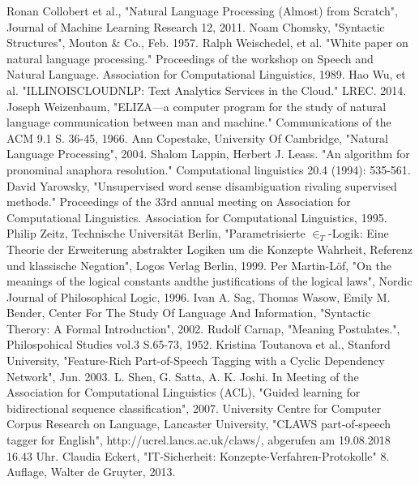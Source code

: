 \documentclass[12pt]{report}
\begin{document}
\newpage
\begin{thebibliography}{20}
Ronan Collobert et al., "Natural Language Processing (Almost) from Scratch", Journal of Machine Learning Research 12, 2011. 
 Noam Chomsky, "Syntactic Structures", Mouton \& Co., Feb. 1957.
Ralph Weischedel, et al. "White paper on natural language processing." Proceedings of the workshop on Speech and Natural Language. Association for Computational Linguistics, 1989.
Hao Wu, et al. "ILLINOISCLOUDNLP: Text Analytics Services in the Cloud." LREC. 2014.
Joseph Weizenbaum, "ELIZA—a computer program for the study of natural language communication between man and machine." Communications of the ACM 9.1 S. 36-45, 1966.
Ann Copestake, University Of Cambridge, "Natural Language Processing", 2004.
 Shalom Lappin, Herbert J. Leass. "An algorithm for pronominal anaphora resolution." Computational linguistics 20.4 (1994): 535-561.
David Yarowsky, "Unsupervised word sense disambiguation rivaling supervised methods." Proceedings of the 33rd annual meeting on Association for Computational Linguistics. Association for Computational Linguistics, 1995.
Philip Zeitz, Technische Universität Berlin, "Parametrisierte $\in_T$-Logik: Eine Theorie der Erweiterung abstrakter Logiken um die Konzepte Wahrheit, Referenz und klassische Negation", Logos Verlag Berlin, 1999.
Per Martin-Löf, "On the meanings of the logical constants andthe justifications of the logical laws", Nordic Journal of Philosophical Logic, 1996.
Ivan A. Sag, Thomas Wasow, Emily M. Bender, Center For The Study Of Language And Information, "Syntactic Therory: A Formal Introduction", 2002.
Rudolf Carnap, "Meaning Postulates.", Philospohical Studies vol.3 S.65-73, 1952.
Kristina Toutanova et al., Stanford University, "Feature-Rich Part-of-Speech Tagging with a Cyclic Dependency Network", Jun. 2003.
 L. Shen, G. Satta, A. K. Joshi. In Meeting of the Association for Computational Linguistics (ACL), "Guided learning for bidirectional sequence classification", 2007.
University Centre for Computer Corpus Research on Language, Lancaster University, "CLAWS part-of-speech tagger for English", http://ucrel.lancs.ac.uk/claws/, abgerufen am 19.08.2018 16.43 Uhr.
Claudia Eckert, "IT-Sicherheit: Konzepte-Verfahren-Protokolle" 8. Auflage, Walter de Gruyter, 2013.

\end{thebibliography}
\end{document}
